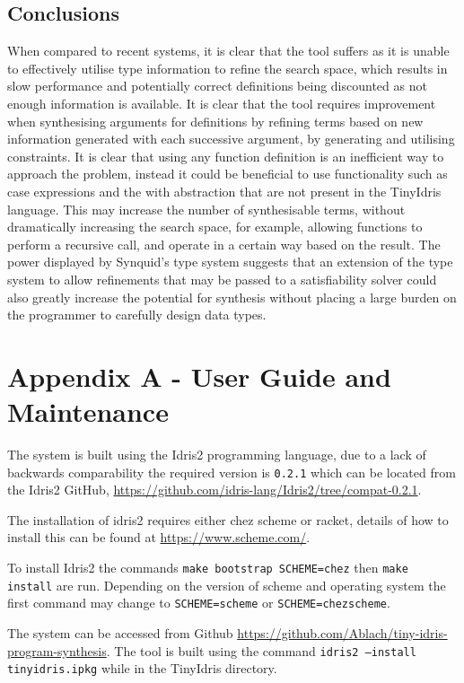 \documentclass[a4paper]{article}
\begin{document}
\subsection{Conclusions}
When compared to recent systems, it is clear that the tool suffers as it is
unable to effectively utilise type information to refine the search space,
which results in slow performance and potentially correct definitions being
discounted as not enough information is available. It is clear that the tool
requires improvement when synthesising arguments for definitions by refining
terms based on new information generated with each successive argument, by
generating and utilising constraints. It is
clear that using any function definition is an inefficient way to approach the
problem, instead it could be beneficial to use functionality such as case
expressions and the with abstraction that are not present in the TinyIdris
language. This may increase the number of synthesisable terms, without dramatically
increasing the search space, for example, allowing functions to perform a recursive call,
and operate in a certain way based on the result. The power displayed by Synquid's
type system suggests that an extension of the type system to allow refinements that
may be passed to a satisfiability solver could also greatly increase the potential
for synthesis without placing a large burden on the programmer to carefully design
data types.


\nocite{*}
  
\clearpage

\section{Appendix A - User Guide and Maintenance}

The system is built using the Idris2 programming language, due to
a lack of backwards comparability the required version is
\texttt{0.2.1} which can be located from the Idris2 GitHub,
\url{https://github.com/idris-lang/Idris2/tree/compat-0.2.1}{}.

The installation of idris2 requires either chez scheme or racket,
details of how to install this can be found at
\url{https://www.scheme.com/}.

To install Idris2 the commands \texttt{make bootstrap SCHEME=chez}
then \texttt{make install} are run. Depending on the version of
scheme and operating system the first command may change to
\texttt{SCHEME=scheme} or \texttt{SCHEME=chezscheme}. 


The system can be accessed from Github \url{https://github.com/Ablach/tiny-idris-program-synthesis}. The tool is built using the command
\texttt{idris2 --install tinyidris.ipkg} while in the TinyIdris
directory. 
\end{document}
